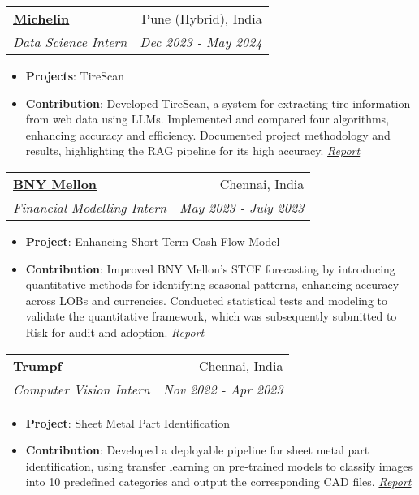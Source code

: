 \documentclass[a4paper,20pt]{article}
\makeatletter
\newcommand{\resumeItem}[2]{
  \item\small{
    \textbf{#1}{: #2 \vspace{-2pt}}
  }
}
\newcommand{\resumeSubheading}[4]{
  \vspace{-1pt}\item
    \begin{tabular*}{0.97\textwidth}{l@{\extracolsep{\fill}}r}
      \textbf{#1} & #2 \\
      \textit{#3} & \textit{#4} \\
    \end{tabular*}\vspace{-5pt}
}
\newcommand{\resumeItemListStart}{\begin{itemize}}
\newcommand{\resumeItemListEnd}{\end{itemize}\vspace{-5pt}}
\makeatother
\begin{document}
\begin{comment}
    \resumeSubheading{Google Summer of Code - Submitty}{Remote}
    {Student Developer (Full-time)}{May 2019 - Sep 2019}
    \resumeItemListStart
        \resumeItem{Discussion Forum Upgrades}
          {Refactor forum for performance to handle large databases.}
          \resumeItem{REST API for Discussion Forum}
          {Symphony \& Twig based Forum parts converted to API-first interface.}
          \resumeItem{Ratchet PHP WebSocket}{Implemented a WebSocket for low-latency real time exchange of posts and thread updates.}
      \resumeItemListEnd
\end{comment}

    \resumeSubheading{\href{https://www.michelin.in/}{Michelin}}{Pune (Hybrid), India}
    {Data Science Intern}{Dec 2023 - May 2024}
    \resumeItemListStart
      \resumeItem{Projects}
        {TireScan}
      \resumeItem{Contribution}
        {Developed TireScan, a system for extracting tire information from web data using LLMs. Implemented and compared four algorithms, enhancing accuracy and efficiency. Documented project methodology and results, highlighting the RAG pipeline for its high accuracy. \textit{\href{https://github.com/sampadk04/Internship_Projects/blob/main/REPORTS/Michelin/TireScan_Report.pdf}{Report}}}
    \resumeItemListEnd

    \resumeSubheading{\href{https://www.bnymellon.com/}{BNY Mellon}}{Chennai, India}
    {Financial Modelling Intern}{May 2023 - July 2023}
    \resumeItemListStart
        \resumeItem{Project}
          {Enhancing Short Term Cash Flow Model}
        \resumeItem{Contribution}
          {Improved BNY Mellon's STCF forecasting by introducing quantitative methods for identifying seasonal patterns, enhancing accuracy across LOBs and currencies. Conducted statistical tests and modeling to validate the quantitative framework, which was subsequently submitted to Risk for audit and adoption. \textit{\href{https://github.com/sampadk04/Internship_Projects/blob/main/REPORTS/BNY_Mellon/Enhancing_Short_Term_Cashflow-Internship_Report.pdf}{Report}}}
    \resumeItemListEnd

    \resumeSubheading{\href{https://www.trumpf.com/en_IN/}{Trumpf}}{Chennai, India}
    {Computer Vision Intern}{Nov 2022 - Apr 2023}
    \resumeItemListStart
        \resumeItem{Project}
          {Sheet Metal Part Identification}
        \resumeItem{Contribution}
          {Developed a deployable pipeline for sheet metal part identification, using transfer learning on pre-trained models to classify images into 10 predefined categories and output the corresponding CAD files. \textit{\href{https://github.com/sampadk04/Internship_Projects/blob/main/REPORTS/Trumpf_Metamation/Sheet_Metal_Part_Recognition-Internship_Report.pdf}{Report}}}
    \resumeItemListEnd
\end{document}
